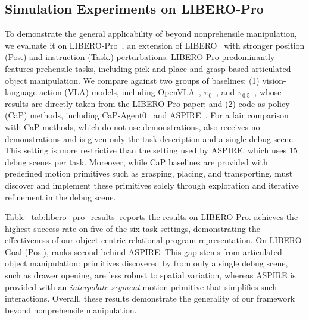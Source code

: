 \begin{table}[t]
    \centering
    \caption{\textbf{Experimental Results on LIBERO-Pro.}}
    \label{tab:libero_pro_results}
    
    \vspace{-0.25in}
\end{table}

\subsection{Simulation Experiments on LIBERO-Pro}
 To demonstrate the general applicability of \ours beyond nonprehensile manipulation, we evaluate it on LIBERO-Pro~\cite{zhou2025libero}, an extension of LIBERO~\cite{liu2023libero} with stronger position (Pos.) and instruction (Task.) perturbations. LIBERO-Pro predominantly features prehensile tasks, including pick-and-place and grasp-based articulated-object manipulation. We compare against two groups of baselines: (1) vision-language-action (VLA) models, including OpenVLA~\cite{kim2024openvla}, $\pi_0$~\cite{black2024pi_0}, and $\pi_{0.5}$~\cite{intelligence2025pi_}, whose results are directly taken from the LIBERO-Pro paper; and (2) code-as-policy (CaP) methods, including CaP-Agent0~\cite{fu2026cap} and ASPIRE~\cite{lu2026aspire}. For a fair comparison with CaP methods, which do not use demonstrations, \ours also receives no demonstrations and is given only the task description and a single debug scene. This setting is more restrictive than the setting used by ASPIRE, which uses 15 debug scenes per task. Moreover, while CaP baselines are provided with predefined motion primitives such as grasping, placing, and transporting, \ours must discover and implement these primitives solely through exploration and iterative refinement in the debug scene.

 Table~\ref{tab:libero_pro_results} reports the results on LIBERO-Pro. \ours achieves the highest success rate on five of the six task settings, demonstrating the effectiveness of our object-centric relational program representation. On LIBERO-Goal (Pos.), \ours ranks second behind ASPIRE. This gap stems from articulated-object manipulation: primitives discovered by \ours from only a single debug scene, such as drawer opening, are less robust to spatial variation, whereas ASPIRE is provided with an \textit{interpolate segment} motion primitive that simplifies such interactions. Overall, these results demonstrate the generality of our framework beyond nonprehensile manipulation.


